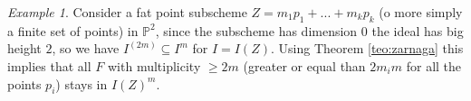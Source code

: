 \documentclass[notitlepage, a4]{book}
\theoremstyle{plain}
\theoremstyle{remark}
\newtheorem{ex}[rem]{Example}
\theoremstyle{definition}
\newcommand{\PP}{\mathbb{P}}
\newcommand{\cont}[2]{ I^{(#1)} \subseteq I^{#2}}
\newcounter{que}
\begin{document}
	\begin{ex}\label{es:P2points}
	Consider a %
	fat point subscheme $ Z = m_1 p_1 + ... +  m_k p_k$ (o more simply a finite set of points) in $ \PP^2 $, since the subscheme has dimension $ 0 $ the ideal has big height $ 2 $, so we have $ \cont{2m}{m} $ for $ I = I(Z) $. Using Theorem \ref{teo:zarnaga} this implies that all $ F $ with multiplicity $ \geq 2m $ (greater or equal than $ 2m_im $ for all the points $ p_i $) stays in $ I(Z)^m $. 
	\end{ex}
	
%	
%	
%	 
	
\end{document}

